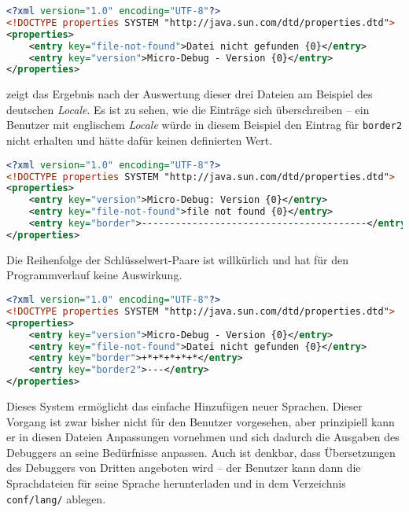 \begin{lstlisting}[language=XML,caption={Beispiel für Datei \texttt{text_de.xml}},label=\lstlbl{locale-file-de}]
<?xml version="1.0" encoding="UTF-8"?>
<!DOCTYPE properties SYSTEM "http://java.sun.com/dtd/properties.dtd">
<properties>
	<entry key="file-not-found">Datei nicht gefunden {0}</entry>
	<entry key="version">Micro-Debug - Version {0}</entry>
</properties>
\end{lstlisting}

 zeigt das Ergebnis nach der Auswertung dieser drei Dateien am Beispiel des deutschen \emph{Locale}. Es ist zu sehen, wie die Einträge sich überschreiben -- ein Benutzer mit englischem \emph{Locale} würde in diesem Beispiel den Eintrag für \texttt{border2} nicht erhalten und hätte dafür keinen definierten Wert.

\begin{lstlisting}[language=XML,caption={Beispiel für Datei \texttt{text.xml}},label=\lstlbl{locale-file}]
<?xml version="1.0" encoding="UTF-8"?>
<!DOCTYPE properties SYSTEM "http://java.sun.com/dtd/properties.dtd">
<properties>
	<entry key="version">Micro-Debug: Version {0}</entry>
	<entry key="file-not-found">file not found {0}</entry>
	<entry key="border">----------------------------------------</entry>
</properties>
\end{lstlisting}

Die Reihenfolge der Schlüsselwert-Paare ist willkürlich und hat für den Programmverlauf keine Auswirkung.

\begin{lstlisting}[language=XML,caption={Beispiel für Ergebnis nach Verarbeitung der Lokalisierungsdateien},label=\lstlbl{locale-result}]
<?xml version="1.0" encoding="UTF-8"?>
<!DOCTYPE properties SYSTEM "http://java.sun.com/dtd/properties.dtd">
<properties>
	<entry key="version">Micro-Debug - Version {0}</entry>
	<entry key="file-not-found">Datei nicht gefunden {0}</entry>
	<entry key="border">+*+*+*+*+*</entry>
	<entry key="border2">---</entry>
</properties>
\end{lstlisting}

Dieses System ermöglicht das einfache Hinzufügen neuer Sprachen. Dieser Vorgang ist zwar bisher nicht für den Benutzer vorgesehen, aber prinzipiell kann er in diesen Dateien Anpassungen vornehmen und sich dadurch die Ausgaben des Debuggers an seine Bedürfnisse anpassen. Auch ist denkbar, dass Übersetzungen des Debuggers von Dritten angeboten wird -- der Benutzer kann dann die Sprachdateien für seine Sprache herunterladen und in dem Verzeichnis \texttt{conf/lang/} ablegen.


